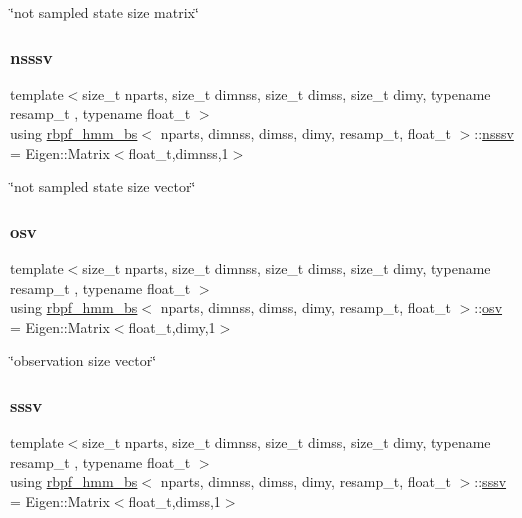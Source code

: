 \char`\"{}not sampled state size matrix\char`\"{} \mbox{\label{classrbpf__hmm__bs_a98c86f40e4ca55ff16156077b11032ca}} 
\subsubsection{\texorpdfstring{nsssv}{nsssv}}
{\footnotesize\ttfamily template$<$size\+\_\+t nparts, size\+\_\+t dimnss, size\+\_\+t dimss, size\+\_\+t dimy, typename resamp\+\_\+t , typename float\+\_\+t $>$ \\
using \hyperlink{classrbpf__hmm__bs}{rbpf\+\_\+hmm\+\_\+bs}$<$ nparts, dimnss, dimss, dimy, resamp\+\_\+t, float\+\_\+t $>$\+::\hyperlink{classrbpf__hmm__bs_a98c86f40e4ca55ff16156077b11032ca}{nsssv} =  Eigen\+::\+Matrix$<$float\+\_\+t,dimnss,1$>$}

\char`\"{}not sampled state size vector\char`\"{} \mbox{\label{classrbpf__hmm__bs_a6ec23f9c6eff96f8967c3c451c32b772}} 
\subsubsection{\texorpdfstring{osv}{osv}}
{\footnotesize\ttfamily template$<$size\+\_\+t nparts, size\+\_\+t dimnss, size\+\_\+t dimss, size\+\_\+t dimy, typename resamp\+\_\+t , typename float\+\_\+t $>$ \\
using \hyperlink{classrbpf__hmm__bs}{rbpf\+\_\+hmm\+\_\+bs}$<$ nparts, dimnss, dimss, dimy, resamp\+\_\+t, float\+\_\+t $>$\+::\hyperlink{classrbpf__hmm__bs_a6ec23f9c6eff96f8967c3c451c32b772}{osv} =  Eigen\+::\+Matrix$<$float\+\_\+t,dimy,1$>$}

\char`\"{}observation size vector\char`\"{} \mbox{\label{classrbpf__hmm__bs_a9a1c8d64f693a34a902dbfcb009d0f96}} 
\subsubsection{\texorpdfstring{sssv}{sssv}}
{\footnotesize\ttfamily template$<$size\+\_\+t nparts, size\+\_\+t dimnss, size\+\_\+t dimss, size\+\_\+t dimy, typename resamp\+\_\+t , typename float\+\_\+t $>$ \\
using \hyperlink{classrbpf__hmm__bs}{rbpf\+\_\+hmm\+\_\+bs}$<$ nparts, dimnss, dimss, dimy, resamp\+\_\+t, float\+\_\+t $>$\+::\hyperlink{classrbpf__hmm__bs_a9a1c8d64f693a34a902dbfcb009d0f96}{sssv} =  Eigen\+::\+Matrix$<$float\+\_\+t,dimss,1$>$}

